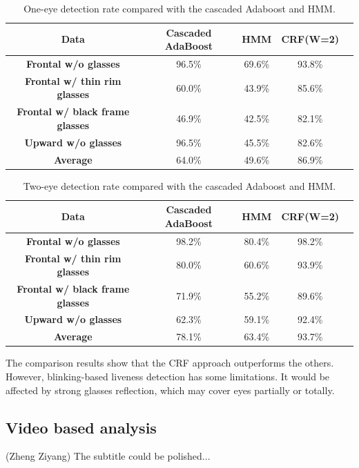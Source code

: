 \documentclass[journal]{IEEEtran}
\begin{document}
\begin{table}[!htbp]
\centering
\caption{One-eye detection rate compared with the cascaded Adaboost and HMM.}
\label{tab_D_1}
\begin{tabular}{ccccc}
\toprule
\textbf{Data} & Cascaded AdaBoost & HMM &  CRF(W=2) \\
\midrule
\textbf{Frontal w/o glasses} & 96.5\% & 69.6\% & 93.8\% \\
\textbf{Frontal w/ thin rim glasses} & 60.0\% & 43.9\% & 85.6\% \\
\textbf{Frontal w/ black frame glasses} & 46.9\% & 42.5\% & 82.1\% \\
\textbf{Upward w/o glasses} & 96.5\% & 45.5\% & 82.6\% \\
\midrule
\textbf{Average} & 64.0\% & 49.6\% & 86.9\% \\
\bottomrule
\end{tabular}
\end{table}

\begin{table}[!htbp]
\centering
\caption{Two-eye detection rate compared with the cascaded Adaboost and HMM.}
\label{tab_D_2}
\begin{tabular}{ccccc}
\toprule
\textbf{Data} & Cascaded AdaBoost & HMM &  CRF(W=2) \\
\midrule
\textbf{Frontal w/o glasses} & 98.2\% & 80.4\% & 98.2\% \\
\textbf{Frontal w/ thin rim glasses} & 80.0\% & 60.6\% & 93.9\% \\
\textbf{Frontal w/ black frame glasses} & 71.9\% & 55.2\% & 89.6\% \\
\textbf{Upward w/o glasses} & 62.3\% & 59.1\% & 92.4\% \\
\midrule
\textbf{Average} & 78.1\% & 63.4\% & 93.7\% \\
\bottomrule
\end{tabular}
\end{table}

The comparison results show that the CRF approach outperforms the others. However, blinking-based liveness detection has some limitations. It would be affected by strong glasses reflection, which may cover eyes partially or totally.

\subsection{Video based analysis}

(Zheng Ziyang) The subtitle could be polished...
\end{document}
